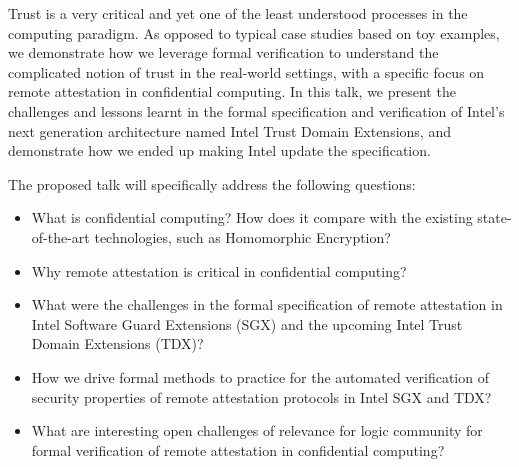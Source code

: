\documentclass[bsl,meeting]{asl}
\def\urladdr#1{\endgraf\noindent{\it URL Address}: {\tt #1}.}
\newcommand{\NP}{}
\begin{document}
\thispagestyle{empty}


\NP  
{}
%


Trust is a very critical and yet one of the least understood processes in the computing paradigm. As opposed to typical case studies based on toy examples, we demonstrate how we leverage formal verification to understand the complicated notion of trust in the real-world settings, with a specific focus on remote attestation in confidential computing. In this talk, we present the challenges and lessons learnt in the formal specification and verification of Intel's next generation architecture named Intel Trust Domain Extensions, and demonstrate how we ended up making Intel update the specification. 

The proposed talk will specifically address the following questions:
\begin{itemize}
    \item What is confidential computing? How does it compare with the existing state-of-the-art technologies, such as Homomorphic Encryption? 
    \item Why remote attestation is critical in confidential computing?
    \item What were the challenges in the formal specification of remote attestation in Intel Software Guard Extensions (SGX) and the upcoming Intel Trust Domain Extensions (TDX)?
    \item How we drive formal methods to practice for the automated verification of security properties of remote attestation protocols in Intel SGX and TDX? 
    \item What are interesting open challenges of relevance for logic community for formal verification of remote attestation in confidential computing? 
\end{itemize}





\vspace*{-0.5\baselineskip}
\end{document}
